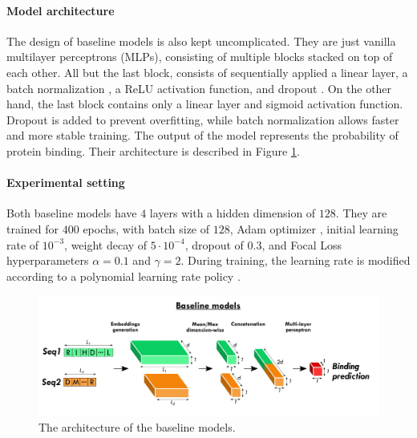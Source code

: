 \documentclass[11pt,a4paper]{article}
\begin{document}
\paragraph{Model architecture}
The design of baseline models is also kept uncomplicated. They are just vanilla multilayer perceptrons (MLPs), consisting of multiple blocks stacked on top of each other. All but the last block, consists of sequentially applied a linear layer, a batch normalization \cite{ioffe2015batch}, a ReLU \cite{agarap2018deep} activation function, and dropout \cite{srivastava2014dropout}. On the other hand, the last block contains only a linear layer and sigmoid \cite{nwankpa2020activation} activation function. Dropout is added to prevent overfitting, while batch normalization allows faster and more stable training. The output of the model represents the probability of protein binding. Their architecture is described in Figure \ref{fig:baseline_archi}.

\paragraph{Experimental setting}

Both baseline models have $4$ layers with a hidden dimension of $128$. They are trained for $400$ epochs, with batch size of $128$, Adam optimizer \cite{kingma2015adam}, initial learning rate of $10^{-3}$, weight decay of $5 \cdot 10^{-4}$, dropout of $0.3$, and Focal Loss hyperparameters $\alpha=0.1$ and $\gamma=2$. During training, the learning rate is modified according to a polynomial learning rate policy \cite{mishra2019polynomial}. 




\begin{figure}[ht]
    \centering
    \includegraphics[width=\textwidth]{baseline_models.png}
    \caption{The architecture of the baseline models.}
    \label{fig:baseline_archi}
\end{figure}
\end{document}
